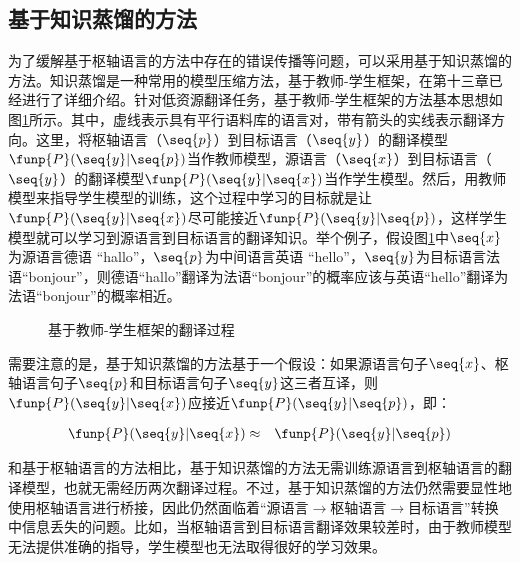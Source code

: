 \subsection{基于知识蒸馏的方法}

\parinterval 为了缓解基于枢轴语言的方法中存在的错误传播等问题，可以采用基于知识蒸馏的方法。知识蒸馏是一种常用的模型压缩方法，基于教师-学生框架，在第十三章已经进行了详细介绍。针对低资源翻译任务，基于教师-学生框架的方法基本思想如图\ref{fig:16-12}所示。其中，虚线表示具有平行语料库的语言对，带有箭头的实线表示翻译方向。这里，将枢轴语言（$\seq{p}$）到目标语言（$\seq{y}$）的翻译模型$\funp{P}(\seq{y}|\seq{p})$当作教师模型，源语言（$\seq{x}$）到目标语言（$\seq{y}$）的翻译模型$\funp{P}(\seq{y}|\seq{x})$当作学生模型。然后，用教师模型来指导学生模型的训练，这个过程中学习的目标就是让$\funp{P}(\seq{y}|\seq{x})$尽可能接近$\funp{P}(\seq{y}|\seq{p})$，这样学生模型就可以学习到源语言到目标语言的翻译知识。举个例子，假设图\ref{fig:16-12}中$\seq{x}$为源语言德语 “hallo”，$\seq{p}$为中间语言英语 “hello”，$\seq{y}$为目标语言法语“bonjour”，则德语“hallo”翻译为法语“bonjour”的概率应该与英语“hello”翻译为法语“bonjour”的概率相近。
\begin{figure}[h]
\centering

\caption{基于教师-学生框架的翻译过程}
\label{fig:16-12}
\end{figure}

\parinterval 需要注意的是，基于知识蒸馏的方法基于一个假设：如果源语言句子$\seq{x}$、枢轴语言句子$\seq{p}$和目标语言句子$\seq{y}$这三者互译，则$\funp{P}(\seq{y}|\seq{x})$应接近$\funp{P}(\seq{y}|\seq{p})$，即：

\begin{eqnarray}
{\funp{P}(\seq{y}|\seq{x})} & \approx & {\funp{P}(\seq{y}|\seq{p})}
\label{eq:16-7}
\end{eqnarray}

\parinterval 和基于枢轴语言的方法相比，基于知识蒸馏的方法无需训练源语言到枢轴语言的翻译模型，也就无需经历两次翻译过程。不过，基于知识蒸馏的方法仍然需要显性地使用枢轴语言进行桥接，因此仍然面临着“源语言$\to$枢轴语言$\to$目标语言”转换中信息丢失的问题。比如，当枢轴语言到目标语言翻译效果较差时，由于教师模型无法提供准确的指导，学生模型也无法取得很好的学习效果。



